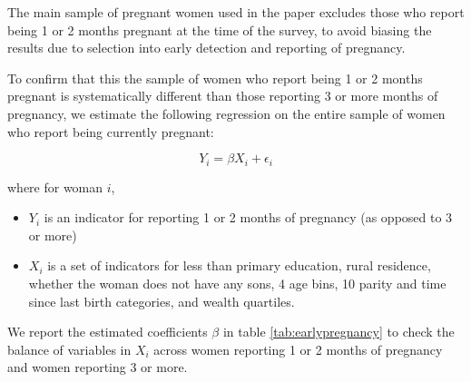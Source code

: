 \documentclass[10pt,twoside,reqno]{article}
\begin{document}
The main sample of pregnant women used in the paper excludes those who report being 1 or 2 months pregnant at the time of the survey, 
to avoid biasing the results due to selection into early detection and reporting of pregnancy.

To confirm that this the sample of women who report being 1 or 2 months pregnant is systematically different than those reporting 3 or more months of 
pregnancy, we estimate the following regression on the entire sample of women who report being currently pregnant:

\begin{equation}
Y_i=\beta X_i+\epsilon_i
\end{equation}

where for woman $i$, 
\begin{itemize}
    \item $Y_i$ is an indicator for reporting 1 or 2 months of pregnancy (as opposed to 3 or more)
    \item $X_i$ is a set of indicators for less than primary education, rural residence, whether the woman does not have any sons, 4 age bins, 10 parity and time since last birth categories, and wealth quartiles. 
\end{itemize}

We report the estimated coefficients $\beta$ in table \ref{tab:earlypregnancy} to check the balance of variables in $X_i$ across women reporting 1 or 2 months of pregnancy and women reporting 3 or more.
\end{document}
